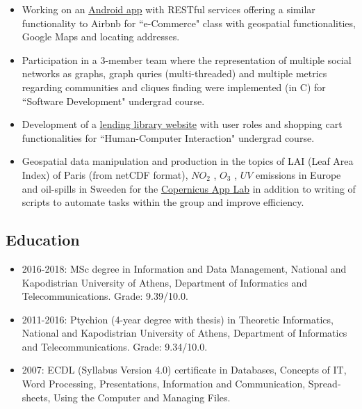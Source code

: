 \documentclass[a4paper,oneside,11pt]{article}
\begin{document}
\begin{itemize}
\begin{sloppypar}
\end{sloppypar}

\item Working on an \href{https://www.dropbox.com/sh/46dg71devshdvv1/AAAvynY_ZJJcsGwdC6ZGsQg5a?dl=0}{Android app} with RESTful services offering a similar functionality to Airbnb for ``e-Commerce" class with geospatial functionalities, Google Maps and locating addresses.

\item Participation in a 3-member team where the representation of multiple social networks as graphs, graph quries (multi-threaded) and multiple metrics regarding communities and cliques finding were implemented (in C) for ``Software Development" undergrad course.

\item Development of a \href{http://dl104.madgik.di.uoa.gr/eamgroup56/index.php}{lending library website} with user roles and shopping cart functionalities for ``Human-Computer Interaction" undergrad course.

\item Geospatial data manipulation and production in the topics of LAI (Leaf Area Index) of Paris (from netCDF format), $NO_2$ , $O_3$ , $UV$ emissions in Europe and oil-spills in Sweeden for the \href{http://www.app-lab.eu/}{Copernicus App Lab} in addition to writing of scripts to automate tasks within the group and improve efficiency. 

\end{itemize}

\subsection*{Education}

\begin{itemize}

\item 2016-2018: MSc degree in Information and Data Management, National and Kapodistrian University of Athens, Department of Informatics and Telecommunications. Grade: 9.39/10.0.

\item 2011-2016: Ptychion (4-year degree with thesis) in Theoretic Informatics, National and Kapodistrian University of Athens, Department of Informatics and Telecommunications. Grade: 9.34/10.0.

\item 2007: \textlatin{ECDL (Syllabus Version 4.0)} certificate in \textlatin{Databases, Concepts of IT, Word Processing, Presentations, Information and Communication, Spreadsheets, Using the Computer and Managing Files}.

\end{itemize}
\end{document}
